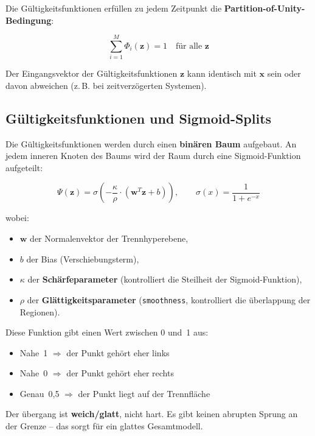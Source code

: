 \documentclass[11pt,a4paper]{report}
\begin{document}
	Die Gültigkeitsfunktionen erfüllen zu jedem Zeitpunkt die \textbf{Partition-of-Unity-Bedingung}:
	
	\begin{equation}
		\sum_{i=1}^{M} \Phi_i(\mathbf{z}) = 1 \quad \text{für alle } \mathbf{z}
	\end{equation}
	
	Der Eingangsvektor der Gültigkeitsfunktionen $\mathbf{z}$ kann identisch mit $\mathbf{x}$ sein oder davon abweichen (z.\,B. bei zeitverzögerten Systemen).
	
	\subsection{Gültigkeitsfunktionen und Sigmoid-Splits}
	
	Die Gültigkeitsfunktionen werden durch einen \textbf{binären Baum} aufgebaut. An jedem inneren Knoten des Baums wird der Raum durch eine Sigmoid-Funktion aufgeteilt:
	
	\begin{equation}
		\Psi(\mathbf{z}) = \sigma\left(-\frac{\kappa}{\rho} \cdot (\mathbf{w}^T \mathbf{z} + b)\right),
		\qquad \sigma(x) = \frac{1}{1+e^{-x}}
	\end{equation}
	
	wobei:
	\begin{itemize}
		\item $\mathbf{w}$ der Normalenvektor der Trennhyperebene,
		\item $b$ der Bias (Verschiebungsterm),
		\item $\kappa$ der \textbf{Schärfeparameter} (kontrolliert die Steilheit der Sigmoid-Funktion),
		\item $\rho$ der \textbf{Glättigkeitsparameter} (\texttt{smoothness}, kontrolliert die überlappung der Regionen).
	\end{itemize}
	
	Diese Funktion gibt einen Wert zwischen 0 und~1 aus:
	\begin{itemize}
		\item Nahe~1 $\Rightarrow$ der Punkt gehört \glqq eher links\grqq{}
		\item Nahe~0 $\Rightarrow$ der Punkt gehört \glqq eher rechts\grqq{}
		\item Genau~0{,}5 $\Rightarrow$ der Punkt liegt auf der Trennfläche
	\end{itemize}
	
	\begin{hinweisbox}
		Der übergang ist \textbf{weich/glatt}, nicht hart. Es gibt keinen abrupten Sprung an der Grenze -- das sorgt für ein glattes Gesamtmodell.
	\end{hinweisbox}
	
\end{document}
